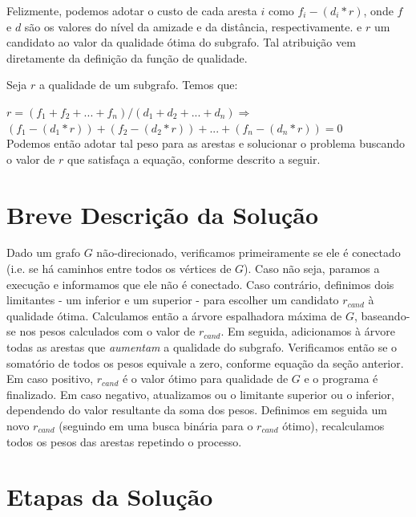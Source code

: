 \documentclass[a4paper,12pt,titlepage]{article}
\begin{document}
Felizmente, podemos adotar o custo de cada aresta $i$ como $f_i - (d_i * r)$, onde $f$ e $d$ são os valores do nível da amizade e da distância, respectivamente. e $r$ um candidato ao valor da qualidade ótima do subgrafo. Tal atribuição vem diretamente da definição da função de qualidade.

Seja $r$ a qualidade de um subgrafo. Temos que:

$ r = (f_1 + f_2 + ... + f_n)  /  (d_1 + d_2 + ... + d_n) \Rightarrow $
\ \\  

$ (f_1 - (d_1 * r)) + (f_2 - (d_2 * r)) + ... + (f_n - (d_n * r)) = 0 $
\ \\ 

Podemos então adotar tal peso para as arestas e solucionar o problema buscando o valor de $r$ que satisfaça a equação, conforme descrito a seguir.

\section{Breve Descrição da Solução}

Dado um grafo $G$ não-direcionado, verificamos primeiramente se ele é conectado (i.e. se há caminhos entre todos os vértices de $G$). Caso não seja, paramos a execução e informamos que ele não é conectado. Caso contrário, definimos dois limitantes - um inferior e um superior - para escolher um candidato $r_{cand}$ à qualidade ótima. Calculamos então a árvore espalhadora máxima de $G$, baseando-se nos pesos calculados com o valor de $r_{cand}$. Em seguida, adicionamos à árvore todas as arestas que \textit{aumentam} a qualidade do subgrafo. Verificamos então se o somatório de todos os pesos equivale a zero, conforme equação da seção anterior. Em caso positivo, $r_{cand}$ é o valor ótimo para qualidade de $G$ e o programa é finalizado. Em caso negativo, atualizamos ou o limitante superior ou o inferior, dependendo do valor resultante da soma dos pesos. Definimos em seguida um novo $r_{cand}$ (seguindo em uma busca binária para o $r_{cand}$ ótimo), recalculamos todos os pesos das arestas repetindo o processo.

\section{Etapas da Solução}
\end{document}
